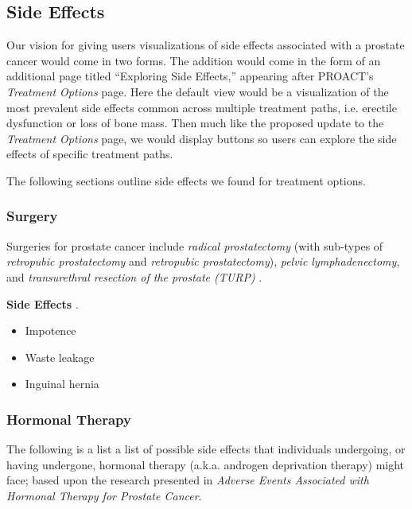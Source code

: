 \documentclass[journal]{vgtc}                %
\begin{document}
        \subsection{Side Effects}
                Our vision for giving users visualizations of side effects associated with a prostate cancer would come in two forms.
                The addition would come in the form of an additional page titled ``Exploring Side Effects,'' appearing after PROACT's \textit{Treatment Options} page.
                Here the default view would be a visualization of the most prevalent side effects common across multiple treatment paths, i.e. erectile dysfunction or loss of bone mass.
                Then much like the proposed update to the \textit{Treatment Options} page, we would display buttons so users can explore the side effects of specific treatment paths.

                The following sections outline side effects we found for treatment options.

                \subsubsection{Surgery}
                        Surgeries for prostate cancer include \textit{radical prostatectomy} (with sub-types of \textit{retropubic prostatectomy} and \textit{retropubic prostatectomy}), \textit{pelvic lymphadenectomy}, and \textit{transurethral resection of the prostate (TURP)} \cite{PDQProstateCancer:2016}.

                        \textbf{Side Effects} \cite{PDQProstateCancer:2016}.
                        \begin{itemize}
                            \item {Impotence}
                            \item {Waste leakage}
                            \item {Inguinal hernia}
                        \end{itemize}


                \subsubsection{Hormonal Therapy}
                        The following is a list a list of possible side effects that individuals undergoing, or having undergone, hormonal therapy (a.k.a. androgen deprivation therapy) might face;  based upon the research presented in \textit{Adverse Events Associated with Hormonal Therapy for Prostate Cancer}\cite{AdverseEvents:2005}.
                        \newline
\end{document}
